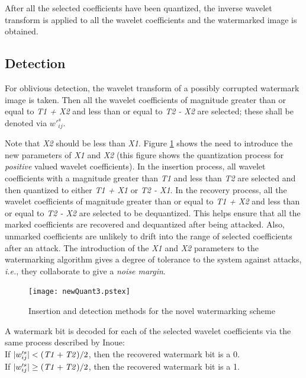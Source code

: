 \documentclass[12pt]{report}
\begin{document}
After all the selected coefficients have been quantized, the inverse wavelet 
transform is applied to all the wavelet coefficients and the watermarked image
is obtained.

\subsection{Detection}
\label{subsec:detDI}
For oblivious detection, the wavelet transform of a possibly corrupted
watermark image is taken. Then all the wavelet coefficients of magnitude greater than
or equal to \emph{T1 + X2} and less than or equal to \emph{T2 - X2} are selected;
these shall be denoted via $w'^{s}_{ij}$.

Note that \emph{X2} should be less than \emph{X1}. Figure \ref{newQuantDI} shows the need to introduce
the new parameters of \emph{X1} and \emph{X2} (this figure shows the quantization process for 
\emph{positive} valued wavelet coefficients).
In the insertion process, all wavelet coefficients
with a magnitude greater than \emph{T1} and less than \emph{T2} are selected and then quantized to
either \emph{T1 + X1} or \emph{T2 - X1}. In the recovery process, all the wavelet coefficients
of magnitude greater than or equal to \emph{T1 + X2} and less than or equal to \emph{T2 - X2} are 
selected to be dequantized.
This helps ensure that all the marked coefficients are recovered and dequantized after
being attacked. Also, 
unmarked coefficients are unlikely to drift into the range of selected coefficients
after an attack. The introduction of the \emph{X1} and \emph{X2} parameters to the watermarking algorithm
gives a degree of tolerance to the system against attacks, \emph{i.e.}, they collaborate to give a \emph{noise margin}.

\begin{figure}[htb]
\setlength{\abovecaptionskip}{-0.2cm}
	\begin{center}
		\texttt{[image: newQuant3.pstex]}
	\end{center}
	\caption{Insertion and detection methods for the novel watermarking scheme}
	\label{newQuantDI}
\end{figure}

A watermark
bit is decoded for each of the selected wavelet coefficients via the same process
described by Inoue: \\
If $|w'^{s}_{ij}| < (\mbox{\emph{T1}} + \mbox{\emph{T2}}) / 2$, then the
recovered watermark bit is a 0. \\
If $|w'^{s}_{ij}| \geq (\mbox{\emph{T1}} + \mbox{\emph{T2}}) / 2$, then the
recovered watermark bit is a 1. 
\end{document}
